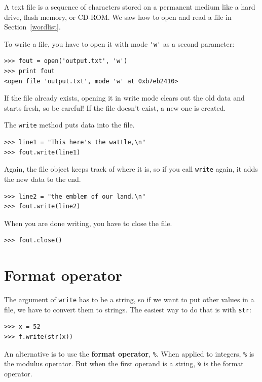 \documentclass[10pt]{book}
\begin{document}
\begin{CJK}{UTF8}{gbsn}
A text file is a sequence of characters stored on a permanent
medium like a hard drive, flash memory, or CD-ROM.  We saw how
to open and read a file in Section~\ref{wordlist}.

To write a file, you have to open it with mode \verb"'w'" as a second
parameter:

\begin{verbatim}
>>> fout = open('output.txt', 'w')
>>> print fout
<open file 'output.txt', mode 'w' at 0xb7eb2410>
\end{verbatim}
%
If the file already exists, opening it in write mode clears out
the old data and starts fresh, so be careful!
If the file doesn't exist, a new one is created.

The {\tt write} method puts data into the file.

\begin{verbatim}
>>> line1 = "This here's the wattle,\n"
>>> fout.write(line1)
\end{verbatim}
%
Again, the file object keeps track of where it is, so if
you call {\tt write} again, it adds the new data to the end.

\begin{verbatim}
>>> line2 = "the emblem of our land.\n"
>>> fout.write(line2)
\end{verbatim}
%
When you are done writing, you have to close the file.

\begin{verbatim}
>>> fout.close()
\end{verbatim}
%


\section{Format operator}

The argument of {\tt write} has to be a string, so if we want
to put other values in a file, we have to convert them to
strings.  The easiest way to do that is with {\tt str}:

\begin{verbatim}
>>> x = 52
>>> f.write(str(x))
\end{verbatim}
%
An alternative is to use the {\bf format operator}, {\tt \%}.  When
applied to integers, {\tt \%} is the modulus operator.  But
when the first operand is a string, {\tt \%} is the format operator.


\end{CJK}
\end{document}
